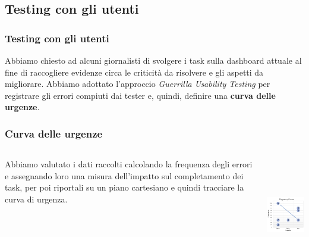 \documentclass[handout]{beamer}
\begin{document}
		\subsection{Testing con gli utenti}

			\begin{frame}
				\frametitle{Testing con gli utenti}
				Abbiamo chiesto ad alcuni giornalisti di svolgere i task sulla dashboard attuale al fine di raccogliere evidenze circa le criticità da risolvere e gli aspetti da migliorare. \newline \newline
				Abbiamo adottato l'approccio \textit{Guerrilla Usability Testing} per registrare gli errori compiuti dai tester e, quindi, definire una \textbf{curva delle urgenze}.
			\end{frame}

			\begin{frame}
				\frametitle{Curva delle urgenze}
				\begin{columns}[t]
					\begin{column}[T]{5cm}
						Abbiamo valutato i dati raccolti calcolando la frequenza degli errori e assegnando loro una misura dell'impatto sul completamento dei task, per poi riportali su un piano cartesiano e quindi tracciare la curva di urgenza.
					\end{column}
					\begin{column}[T]{5cm}
						\includegraphics[height=5cm]{img/urgency_curve}
					\end{column}
				\end{columns}
			\end{frame}
		 
\end{document}

